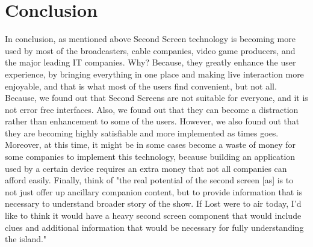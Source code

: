 \documentclass[12pt, oneside]{amsart}   	%
\begin{document}
 \section{Conclusion}

In conclusion, as mentioned above Second Screen technology is becoming more used by most of the broadcasters, cable companies, video game producers, and the major leading IT companies.  Why? Because, they greatly enhance the user experience, by bringing everything in one place and making live interaction more enjoyable, and that is what most of the users find convenient, but not all. Because, we found out that Second Screens are not suitable for everyone, and it is not error free interfaces.  Also, we found out that they can become a distraction rather than enhancement to some of the users.  However, we also found out that they are becoming highly satisfiable and more implemented as times goes.  Moreover, at this time, it might be in some cases become a waste of money for some companies to implement this technology, because building an application used by a certain device requires an extra money that not all companies can afford easily. Finally, think of "the real potential of the second screen [as] is to not just offer up ancillary companion content, but to provide information that is necessary to understand broader story of the show. If Lost were to air today, I'd like to think it would have a heavy second screen component that would include clues and additional information that would be necessary for fully understanding the island."\cite{Second-Screen-His}
 
 

 
 
\end{document}
